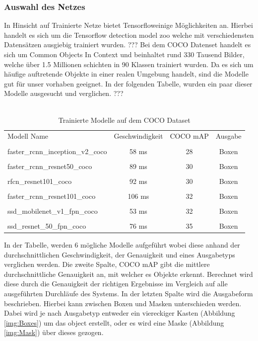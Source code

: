 \documentclass[a4paper,12pt,oneside]{article}
\begin{document}
  \subsubsection{Auswahl des Netzes} 
In Hinsicht auf Trainierte Netze bietet \glqq Tensorflow\grqq einige Möglichkeiten an. Hierbei handelt es sich um die \glqq Tensorflow detection model zoo\grqq \cite{google2018zoo} welche mit verschiedensten Datensätzen ausgiebig trainiert wurden. ??? Bei dem COCO Datenset handelt es sich um \glqq Common Objects In Context\grqq \cite{common2018data} und beinhaltet rund 330 Tausend Bilder, welche über 1.5 Millionen schichten in 90 Klassen trainiert wurden. Da es sich um häufige auftretende Objekte in einer realen Umgebung handelt, sind die Modelle gut für unser vorhaben geeignet. In der folgenden Tabelle, wurden ein paar dieser Modelle ausgesucht und verglichen. ???
\\
\\

\begin{table}
[h]
\begin{tabular}{|l|c|c|c|}
 
Modell Name & Geschwindigkeit & COCO mAP & Ausgabe\\
 & & & \\
faster\_rcnn\_inception\_v2\_coco & 58 ms & 28 & Boxen\\
 & & & \\
faster\_rcnn\_resnet50\_coco & 89 ms & 30 & Boxen\\
 & & & \\
rfcn\_resnet101\_coco & 92 ms & 30 & Boxen\\
 & & & \\
faster\_rcnn\_resnet101\_coco & 106 ms & 32 & Boxen\\
 & & & \\
ssd\_mobilenet\_v1\_fpn\_coco & 53 ms & 32 & Boxen\\
 & & & \\
ssd\_resnet\_50\_fpn\_coco & 76 ms & 35 & Boxen

\vspace{0.5 cm}
 
\end{tabular}
\caption{Trainierte Modelle auf dem COCO Dataset \cite{google2018zoo}}
\end{table}


In der Tabelle, werden 6 mögliche Modelle aufgeführt wobei diese anhand der durchschnittlichen Geschwindigkeit, der Genauigkeit und eines Ausgabetyps verglichen werden. Die zweite Spalte, COCO mAP gibt die mittlere durchschnittliche Genauigkeit an, mit welcher es Objekte erkennt. Berechnet wird diese durch die Genauigkeit der richtigen Ergebnisse im Vergleich auf alle ausgeführten Durchläufe des Systems. In der letzten Spalte wird die Ausgabeform beschrieben. Hierbei kann zwischen Boxen und Masken unterschieden werden. Dabei wird je nach Ausgabetyp entweder ein viereckiger Kasten (Abbildung \ref{img:Boxes}) um das object erstellt, oder es wird eine Maske (Abbildung \ref{img:Mask}) über dieses gezogen.
\end{document}
